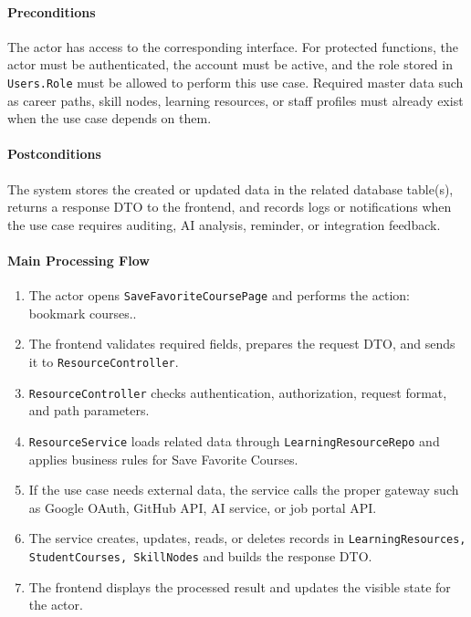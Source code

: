 \paragraph{Preconditions}

The actor has access to the corresponding interface. For protected functions, the actor must be authenticated, the account must be active, and the role stored in \texttt{Users.Role} must be allowed to perform this use case. Required master data such as career paths, skill nodes, learning resources, or staff profiles must already exist when the use case depends on them.

\paragraph{Postconditions}

The system stores the created or updated data in the related database table(s), returns a response DTO to the frontend, and records logs or notifications when the use case requires auditing, AI analysis, reminder, or integration feedback.

\paragraph{Main Processing Flow}

\begin{enumerate}
    \item The actor opens \texttt{SaveFavoriteCoursePage} and performs the action: bookmark courses..
    \item The frontend validates required fields, prepares the request DTO, and sends it to \texttt{ResourceController}.
    \item \texttt{ResourceController} checks authentication, authorization, request format, and path parameters.
    \item \texttt{ResourceService} loads related data through \texttt{LearningResourceRepo} and applies business rules for Save Favorite Courses.
    \item If the use case needs external data, the service calls the proper gateway such as Google OAuth, GitHub API, AI service, or job portal API.
    \item The service creates, updates, reads, or deletes records in \texttt{LearningResources, StudentCourses, SkillNodes} and builds the response DTO.
    \item The frontend displays the processed result and updates the visible state for the actor.
\end{enumerate}

